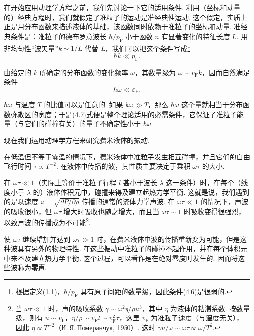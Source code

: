 在开始应用动理学方程之前，我们先讨论一下它的适用条件. 利用（坐标和动量的）经典方程时，我们就假定了准粒子的运动是准经典性运动. 这个假定，实质上正是用分布函数来描述液体的基础，该函数同时依赖于准粒子的坐标和动量. 准经典条件是：准粒子的德布罗意波长 $\hbar/p_{\mathrm F}$ 小于函数 $n$ 有显著变化的特征长度 $L$. 用非均匀性“波矢量”$k\sim1/L$ 代替 $L$，我们可以把这个条件写成\footnote{根据定义(1.1)，$\hbar/p_{\mathrm F}$ 具有原子间距的数量级，因此条件(4.6)是很弱的.}
\begin{equation}
\hbar k\ll p_{\mathrm F}.
\end{equation}

由给定的 $k$ 所确定的分布函数的变化频率 $\omega$，其数量级为 $\omega\sim v_{\mathrm F}k$，因而自然满足条件
\begin{equation}
\hbar\omega\ll\varepsilon_{\mathrm F}.
\end{equation}

$\hbar\omega$ 与温度 $T$ 的比值可以是任意的. 如果 $\hbar\omega\gg T$，那么 $\hbar\omega$ 这个量就相当于分布函数弥散区的宽度；于是(4.7)式便是整个理论适用的必需条件，它保证了准粒子能量（与它们的碰撞有关）的量子不确定性小于 $\hbar\omega$.

现在我们运用动理学方程来研究费米液体的振动.

在低温但不等于零温的情况下，费米液体中准粒子发生相互碰撞，并且它们的自由飞行时间 $\tau\propto T^{-2}$. 在液体中传播的波，其性质主要决定于乘积 $\omega\tau$ 的大小.

在 $\omega\tau\ll1$（实际上等价于准粒子行程 $l$ 甚小于波长 $\lambda$ 这一条件）时，在每个（线度小于 $\lambda$ 的）液体体积元中，碰撞来得及建立起热力学平衡. 这就是说，我们遇到的是以速度 $u=\sqrt{\partial P/\partial\rho}$ 传播的通常的流体力学声波. 在 $\omega\tau\ll1$ 的情况下，声波的吸收很小，但 $\omega\tau$ 增大时吸收也随之增大，而且当 $\omega\tau\sim1$ 时吸收变得很强烈，以致声波的传播成为不可能\footnote{当 $\omega\tau\ll1$ 时，声的吸收系数 $\gamma\sim\omega^{2}\eta/\rho u^{3}$，其中 $\eta$ 为液体的粘滞系数. 按数量级，则有 $u\sim v_{\mathrm F}$，$\eta/\rho\sim v_{\mathrm F}l\sim v_{\mathrm F}^{2}\tau$，这里 $v_{\mathrm F}$ 为准粒子速度（与温度无关），因此 $\eta\propto T^{-2}$（И.\,Я.\,Померанчук, 1950）. 这时 $\gamma u/\omega\sim\omega\tau\propto\omega/T^{2}$.}.

使 $\omega\tau$ 继续增加并达到 $\omega\tau\gg1$ 时，在费米液体中波的传播重新变为可能，但是这种波具有另外的物理特性. 在这些振动中准粒子的碰撞不起作用，并在每个体积元中来不及建立热力学平衡. 这个过程，可以看作是在绝对零度时发生的. 因而将这些波称为\textbf{零声}.


